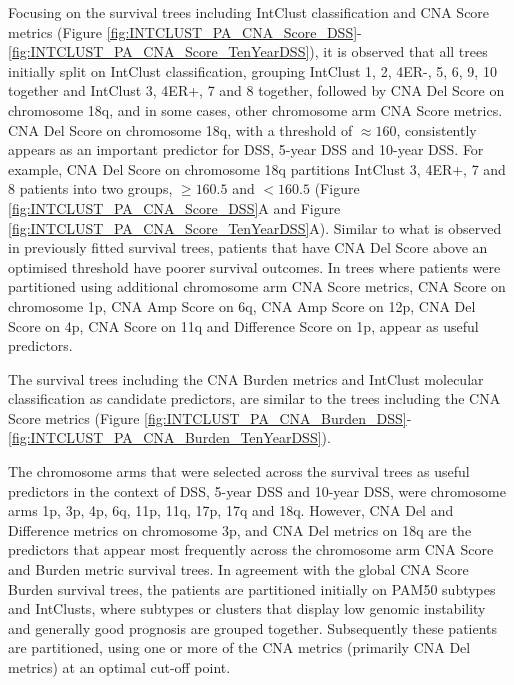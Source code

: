 Focusing on the survival trees including IntClust classification and CNA Score metrics (Figure \ref{fig:INTCLUST_PA_CNA_Score_DSS}-\ref{fig:INTCLUST_PA_CNA_Score_TenYearDSS}), it is observed that all trees initially split on IntClust classification, grouping IntClust 1, 2, 4ER-, 5, 6, 9, 10 together and IntClust 3, 4ER+, 7 and 8 together, followed by CNA Del Score on chromosome 18q, and in some cases, other chromosome arm CNA Score metrics. CNA Del Score on chromosome 18q, with a threshold of $\approx 160$, consistently appears as an important predictor for DSS, 5-year DSS and 10-year DSS. For example, CNA Del Score on chromosome 18q partitions IntClust 3, 4ER+, 7 and 8 patients into two groups, $\geq 160.5$ and $<160.5$ (Figure \ref{fig:INTCLUST_PA_CNA_Score_DSS}A and Figure \ref{fig:INTCLUST_PA_CNA_Score_TenYearDSS}A). Similar to what is observed in previously fitted survival trees, patients that have CNA Del Score above an optimised threshold have poorer survival outcomes. In trees where patients were partitioned using additional chromosome arm CNA Score metrics, CNA Score on chromosome 1p, CNA Amp Score on 6q, CNA Amp Score on 12p, CNA Del Score on 4p, CNA Score on 11q and Difference Score on 1p, appear as useful predictors. 

The survival trees including the CNA Burden metrics and IntClust molecular classification as candidate predictors, are similar to the trees including the CNA Score metrics (Figure \ref{fig:INTCLUST_PA_CNA_Burden_DSS}-\ref{fig:INTCLUST_PA_CNA_Burden_TenYearDSS}). 

The chromosome arms that were selected across the survival trees as useful predictors in the context of DSS, 5-year DSS and 10-year DSS, were chromosome arms 1p, 3p, 4p, 6q, 11p, 11q, 17p, 17q and 18q. However, CNA Del and Difference metrics on chromosome 3p, and CNA Del metrics on 18q are the predictors that appear most frequently across the chromosome arm CNA Score and Burden metric survival trees. In agreement with the global CNA Score Burden survival trees, the patients are partitioned initially on PAM50 subtypes and IntClusts, where subtypes or clusters that display low genomic instability and generally good prognosis are grouped together. Subsequently these patients are partitioned, using one or more of the CNA metrics (primarily CNA Del metrics) at an optimal cut-off point.

